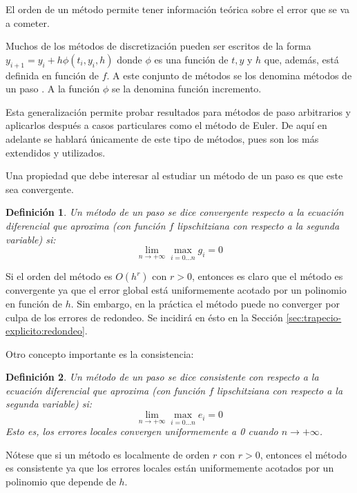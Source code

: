 \documentclass{article}
\theoremstyle{theorem-style}  %
\theoremstyle{definition-style}
\newtheorem{definition}{Definición}[section]
\theoremstyle{example-style}
\begin{document}
	El orden de un método permite tener información teórica sobre el error que se va a cometer.

    Muchos de los métodos de discretización pueden ser escritos de la forma $y_{i+1}=y_i + h \phi(t_i,y_i,h)$ donde $\phi$ es una función de $t, y$ y $h$ que, además, está definida en función de $f$. A este conjunto de métodos se los denomina métodos de un paso \cite{gear}. A la función $\phi$ se la denomina función incremento.

    Esta generalización permite probar resultados para métodos de paso arbitrarios y aplicarlos después a casos particulares como el método de Euler. De aquí en adelante se hablará únicamente de este tipo de métodos, pues son los más extendidos y utilizados.

    Una propiedad que debe interesar al estudiar un método de un paso es que este sea convergente.

	\begin{definition}
		Un método de un paso se dice convergente respecto a la ecuación diferencial que aproxima (con función $f$ lipschitziana con respecto a la segunda variable) si:
		$$ \lim_{n \rightarrow +\infty} \max_{i = 0 \ldots n} g_i = 0 $$
	\end{definition}

	Si el orden del método es $O(h^r)$ con $r > 0$, entonces es claro que el método es convergente ya que el error global está uniformemente acotado por un polinomio en función de $h$. Sin embargo, en la práctica el método puede no converger por culpa de los errores de redondeo. Se incidirá en ésto en la Sección \ref{sec:trapecio-explicito:redondeo}.

    Otro concepto importante es la consistencia:
    \begin{definition}
    	Un método de un paso se dice consistente con respecto a la ecuación diferencial que aproxima (con función $f$ lipschitziana con respecto a la segunda variable) si:
    	$$ \lim_{n \rightarrow +\infty} \max_{i = 0 \ldots n} e_i = 0 $$
    	Esto es, los errores locales convergen uniformemente a 0 cuando $n \rightarrow +\infty$.
    \end{definition}

    Nótese que si un método es localmente de orden $r$ con $r > 0$, entonces el método es consistente ya que los errores locales están uniformemente acotados por un polinomio que depende de $h$.
\end{document}
